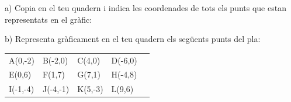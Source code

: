  
\begin{mylist}

 

\vspace{-3cm}
\exer  \begin{minipage}[t]{0.5\textwidth} a) Copia en el teu quadern i indica les coordenades de tots els punts que estan representats en el gràfic: 

 b) Representa gràficament en el teu quadern els següents punts del pla: 

\begin{tabular}{lllll}
 A(0,-2) &  B(-2,0) & C(4,0) & D(-6,0) \\
 E(0,6) & F(1,7) & G(7,1) & H(-4,8) \\
  I(-1,-4) & J(-4,-1) &  K(5,-3) &  L(9,6) \\
\end{tabular}


\end{minipage}
\end{mylist}
